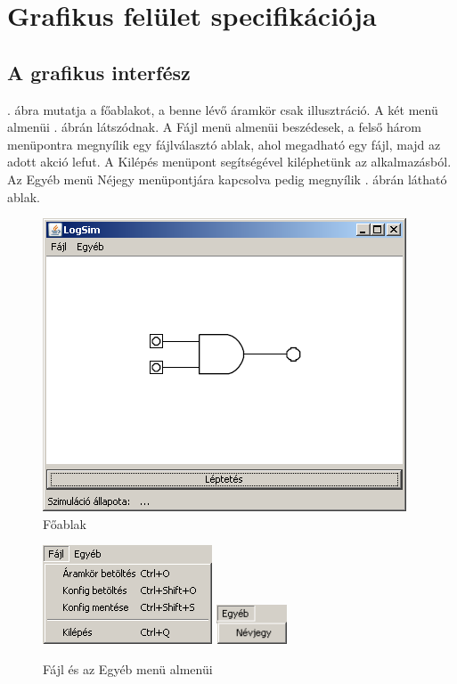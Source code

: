 %
\chapter{Grafikus felület specifikációja}

\thispagestyle{fancy}

\section{A grafikus interfész}

. ábra mutatja a főablakot, a benne lévő áramkör csak illusztráció. A két menü almenüi . ábrán látszódnak. A Fájl menü almenüi beszédesek, a felső három menüpontra megnyílik egy fájlválasztó ablak, ahol megadható egy fájl, majd az adott akció lefut. A Kilépés menüpont segítségével kiléphetünk az alkalmazásból. Az Egyéb menü Néjegy menüpontjára kapcsolva pedig megnyílik . ábrán látható ablak.

\begin{figure}[h]
\begin{center}
\includegraphics[width=4.25in]{chapters/chapter11/screenshots/felulet.png}
\caption{Főablak}
\label{fig:main}
\end{center}
\end{figure}

\begin{figure}[h]
\begin{center}
\includegraphics[width=1.98in]{chapters/chapter11/screenshots/menus1.png}
\includegraphics[width=0.83in]{chapters/chapter11/screenshots/menus2.png}
\caption{Fájl és az Egyéb menü almenüi}
\label{fig:menus}
\end{center}
\end{figure}

